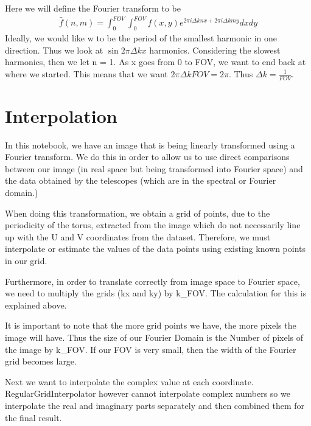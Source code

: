 \documentclass[letterpaper,10pt,english]{jupyterBook}
\begin{document}
\sphinxAtStartPar
Here we will define the Fourier transform to be
\begin{equation*}
\begin{split}\hat{f}(n,m) = \int_0^{FOV} \int_0^{FOV} f(x,y)e^{2\pi i \Delta k n x + 2\pi i \Delta k m y} dx dy\end{split}
\end{equation*}
\sphinxAtStartPar
Ideally, we would like w to be the period of the smallest harmonic in one direction. Thus we look at \(\sin 2\pi \Delta k x\) harmonics. Considering the slowest harmonics, then we let n = 1. As x goes from 0 to FOV, we want to end back at where we started. This means that we want \(2\pi \Delta k FOV = 2\pi\). Thus \(\Delta k = \frac{1}{FOV}\).


\section{Interpolation}
\label{\detokenize{interpolation:interpolation}}
\sphinxAtStartPar
In this notebook, we have an image that is being linearly transformed using a Fourier transform. We do this in order to allow us to use direct comparisons between our image (in real space but being transformed into Fourier space) and the data obtained by the telescopes (which are in the spectral or Fourier domain.)

\sphinxAtStartPar
When doing this transformation, we obtain a grid of points, due to the periodicity of the torus, extracted from the image which do not necessarily line up with the U and V coordinates from the dataset. Therefore, we must interpolate or estimate the values of the data points using existing known points in our grid.

\sphinxAtStartPar
Furthermore, in order to translate correctly from image space to Fourier space, we need to multiply the grids (kx and ky) by k\_FOV. The calculation for this is explained above.

\sphinxAtStartPar
It is important to note that the more grid points we have, the more pixels the image will have. Thus the size of our Fourier Domain is the Number of pixels of the image by k\_FOV. If our FOV is very small, then the width of the Fourier grid becomes large.

\sphinxAtStartPar
Next we want to interpolate the complex value at each coordinate. RegularGridInterpolator however cannot interpolate complex numbers so we interpolate the real and imaginary parts separately and then combined them for the final result.
\end{document}

